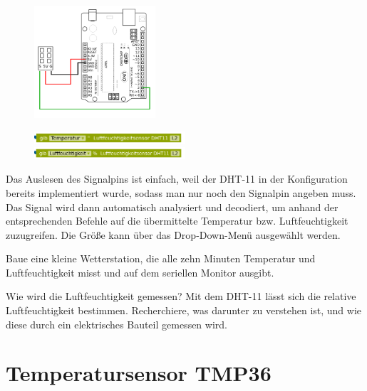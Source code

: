 \begin{figure}[H]
	\centering
	\includegraphics[width=0.4\textwidth]{./Zeichnungen/Schaltplan-DHT11.png}
\end{figure}

\vspace{-\baselineskip}
\begin{figure}
	\centering
	\includegraphics[width=0.5\textwidth]{./pics/dht-gibTemperatur.png}
	\includegraphics[width=0.5\textwidth]{./pics/dht-gibLuftfeuchtigkeit.png}
\end{figure}
Das Auslesen des Signalpins ist einfach, weil der DHT-11 in der Konfiguration bereits implementiert wurde, sodass man nur noch den Signalpin angeben muss. Das Signal wird dann automatisch analysiert und decodiert, um anhand der entsprechenden Befehle auf die übermittelte Temperatur bzw. Luftfeuchtigkeit zuzugreifen. Die Größe kann über das Drop-Down-Menü ausgewählt werden.

\bigskip
\begin{projekt}[Wetterstation]\label{proj:wetterstation}
	Baue eine kleine Wetterstation, die alle zehn Minuten Temperatur und Luftfeuchtigkeit misst und auf dem seriellen Monitor ausgibt.
\end{projekt}

\begin{recherche}{Wie wird die Luftfeuchtigkeit gemessen?}
	Mit dem DHT-11 lässt sich die relative Luftfeuchtigkeit bestimmen. Recherchiere, was darunter zu verstehen ist, und wie diese durch ein elektrisches Bauteil gemessen wird.
\end{recherche}

\newpage
\section{Temperatursensor TMP36}
\label{sec:tmp36}

